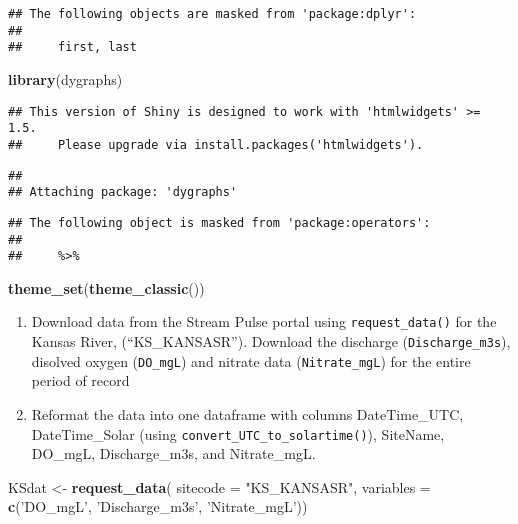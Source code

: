 \documentclass[]{article}
\newenvironment{Shaded}{\begin{snugshade}}{\end{snugshade}}
\newcommand{\DataTypeTok}[1]{\textcolor[rgb]{0.13,0.29,0.53}{#1}}
\newcommand{\KeywordTok}[1]{\textcolor[rgb]{0.13,0.29,0.53}{\textbf{#1}}}
\newcommand{\NormalTok}[1]{#1}
\newcommand{\StringTok}[1]{\textcolor[rgb]{0.31,0.60,0.02}{#1}}
\begin{document}
\begin{verbatim}
## The following objects are masked from 'package:dplyr':
## 
##     first, last
\end{verbatim}

\begin{Shaded}
\begin{Highlighting}[]
\KeywordTok{library}\NormalTok{(dygraphs)}
\end{Highlighting}
\end{Shaded}

\begin{verbatim}
## This version of Shiny is designed to work with 'htmlwidgets' >= 1.5.
##     Please upgrade via install.packages('htmlwidgets').
\end{verbatim}

\begin{verbatim}
## 
## Attaching package: 'dygraphs'
\end{verbatim}

\begin{verbatim}
## The following object is masked from 'package:operators':
## 
##     %>%
\end{verbatim}

\begin{Shaded}
\begin{Highlighting}[]
\KeywordTok{theme_set}\NormalTok{(}\KeywordTok{theme_classic}\NormalTok{())}
\end{Highlighting}
\end{Shaded}

\begin{enumerate}
\def\labelenumi{\arabic{enumi}.}
\setcounter{enumi}{3}
\item
  Download data from the Stream Pulse portal using
  \texttt{request\_data()} for the Kansas River, (``KS\_KANSASR'').
  Download the discharge (\texttt{Discharge\_m3s}), disolved oxygen
  (\texttt{DO\_mgL}) and nitrate data (\texttt{Nitrate\_mgL}) for the
  entire period of record
\item
  Reformat the data into one dataframe with columns DateTime\_UTC,
  DateTime\_Solar (using \texttt{convert\_UTC\_to\_solartime()}),
  SiteName, DO\_mgL, Discharge\_m3s, and Nitrate\_mgL.
\end{enumerate}

\begin{Shaded}
\begin{Highlighting}[]
\NormalTok{KSdat <-}\StringTok{ }\KeywordTok{request_data}\NormalTok{(}
  \DataTypeTok{sitecode =} \StringTok{"KS_KANSASR"}\NormalTok{,}
  \DataTypeTok{variables =} \KeywordTok{c}\NormalTok{(}\StringTok{'DO_mgL'}\NormalTok{, }\StringTok{'Discharge_m3s'}\NormalTok{, }\StringTok{'Nitrate_mgL'}\NormalTok{))}
\end{Highlighting}
\end{Shaded}
\end{document}
